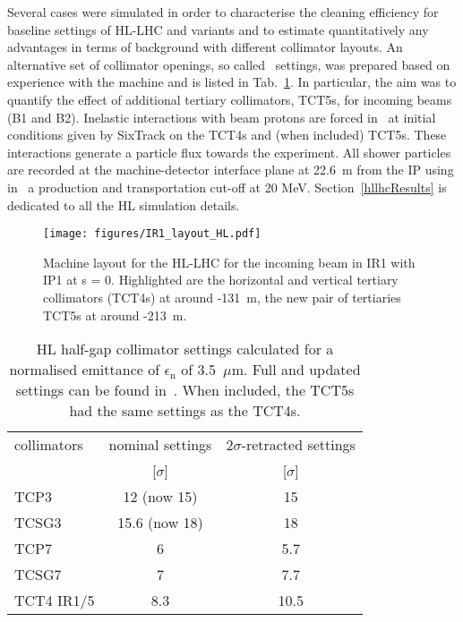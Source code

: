 Several cases were simulated in order to characterise the cleaning efficiency for baseline settings of HL-LHC and variants and to estimate quantitatively any advantages in terms of background with different collimator layouts. An alternative set of collimator openings, so called \twosigmaret~settings, was prepared based on experience with the machine and is listed in Tab.~\ref{HLcollSettings}. In particular, the aim was to quantify the effect of additional tertiary collimators, TCT5s, for incoming beams (B1 and B2). Inelastic interactions with beam protons are forced in \fluka~at initial conditions given by SixTrack on the TCT4s and (when included) TCT5s. These interactions generate a particle flux towards the experiment. All shower particles are recorded at the machine-detector interface plane at 22.6~m from the IP using in \fluka~a production and transportation cut-off at 20 MeV. Section~\ref{hllhcResults} is dedicated to all the HL simulation details.

\begin{figure}%
\begin{center}
\texttt{[image: figures/IR1\_layout\_HL.pdf]}
\end{center}
\vspace{-0.6cm}
 \caption{Machine layout for the HL-LHC for the incoming beam in IR1 with IP1 at s = 0. Highlighted are the horizontal and vertical tertiary collimators (TCT4s) at around -131~m, the new pair of tertiaries TCT5s at around -213~m.
  \label{hllhc_layout}}
\end{figure}


 \begin{table}[hbt]
   \centering
   \caption{HL half-gap collimator settings calculated for a normalised emittance of $\epsilon_{\mathrm{n}}$ of 3.5~$\mu$m. Full and updated settings can be found in~\cite{collSettRef}. When included, the TCT5s had the same settings as the TCT4s.}

   \begin{tabular}{l|c|c}
       \hline
       collimators &        nominal settings & $2\sigma$-retracted settings\\
                   &         [$\sigma$] &  [$\sigma$]\\
       \hline
       TCP3 & 12 (now 15) & 15 \\
       TCSG3 & 15.6 (now 18)& 18 \\
       TCP7 & 6 & 5.7 \\
       TCSG7 & 7 & 7.7 \\
       TCT4 IR1/5 & 8.3 & 10.5 \\
       \hline
   \end{tabular}
   \label{HLcollSettings}
\end{table}

